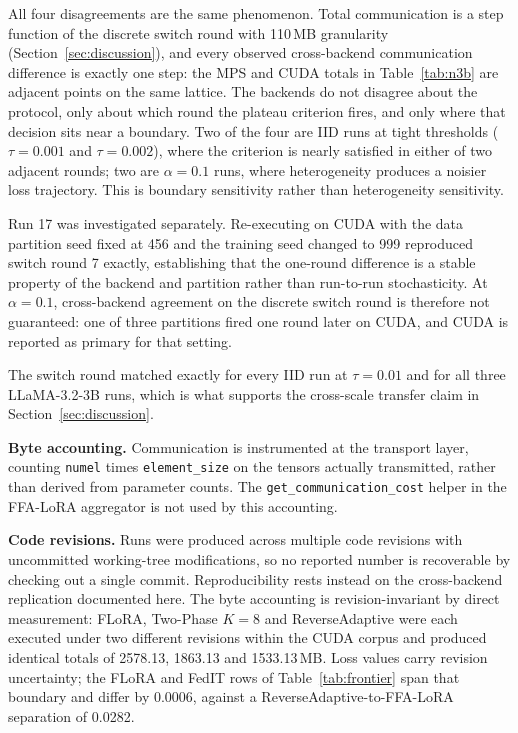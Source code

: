 All four disagreements are the same phenomenon. Total communication is a step function of the discrete switch round with 110\,MB granularity (Section~\ref{sec:discussion}), and every observed cross-backend communication difference is exactly one step: the MPS and CUDA totals in Table~\ref{tab:n3b} are adjacent points on the same lattice. The backends do not disagree about the protocol, only about which round the plateau criterion fires, and only where that decision sits near a boundary. Two of the four are IID runs at tight thresholds ($\tau{=}0.001$ and $\tau{=}0.002$), where the criterion is nearly satisfied in either of two adjacent rounds; two are $\alpha{=}0.1$ runs, where heterogeneity produces a noisier loss trajectory. This is boundary sensitivity rather than heterogeneity sensitivity.

Run 17 was investigated separately. Re-executing on CUDA with the data partition seed fixed at 456 and the training seed changed to 999 reproduced switch round 7 exactly, establishing that the one-round difference is a stable property of the backend and partition rather than run-to-run stochasticity. At $\alpha{=}0.1$, cross-backend agreement on the discrete switch round is therefore not guaranteed: one of three partitions fired one round later on CUDA, and CUDA is reported as primary for that setting.

The switch round matched exactly for every IID run at $\tau{=}0.01$ and for all three LLaMA-3.2-3B runs, which is what supports the cross-scale transfer claim in Section~\ref{sec:discussion}.

\textbf{Byte accounting.} Communication is instrumented at the transport layer, counting \texttt{numel} times \texttt{element\_size} on the tensors actually transmitted, rather than derived from parameter counts. The \texttt{get\_communication\_cost} helper in the FFA-LoRA aggregator is not used by this accounting.

\textbf{Code revisions.} Runs were produced across multiple code revisions with uncommitted working-tree modifications, so no reported number is recoverable by checking out a single commit. Reproducibility rests instead on the cross-backend replication documented here. The byte accounting is revision-invariant by direct measurement: FLoRA, Two-Phase $K{=}8$ and ReverseAdaptive were each executed under two different revisions within the CUDA corpus and produced identical totals of 2578.13, 1863.13 and 1533.13\,MB. Loss values carry revision uncertainty; the FLoRA and FedIT rows of Table~\ref{tab:frontier} span that boundary and differ by 0.0006, against a ReverseAdaptive-to-FFA-LoRA separation of 0.0282.

